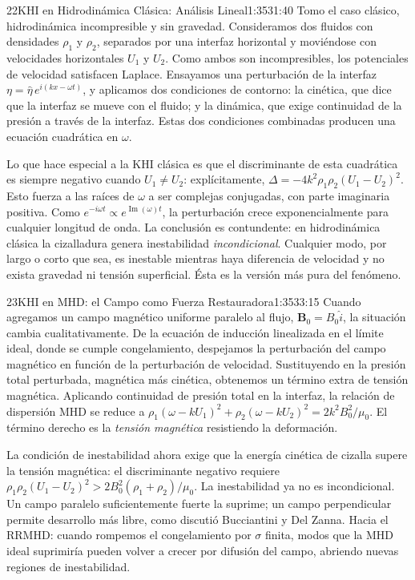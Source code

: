 \documentclass[11pt,a4paper]{article}
\begin{document}
\begin{seborador}{22}{KHI en Hidrodinámica Clásica: Análisis Lineal}{1:35}{31:40}
Tomo el caso clásico, hidrodinámica incompresible y sin gravedad.
Consideramos dos fluidos con densidades $\rho_1$ y $\rho_2$, separados por
una interfaz horizontal y moviéndose con velocidades horizontales $U_1$ y
$U_2$. Como ambos son incompresibles, los potenciales de velocidad satisfacen
Laplace. Ensayamos una perturbación de la interfaz
$\eta=\hat\eta\,e^{i(kx-\omega t)}$, y aplicamos dos condiciones de contorno:
la cinética, que dice que la interfaz se mueve con el fluido; y la dinámica,
que exige continuidad de la presión a través de la interfaz. Estas dos
condiciones combinadas producen una ecuación cuadrática en $\omega$.

Lo que hace especial a la KHI clásica es que el discriminante de esta
cuadrática es siempre negativo cuando $U_1\neq U_2$: explícitamente,
$\Delta=-4k^2\rho_1\rho_2(U_1-U_2)^2$. Esto fuerza a las raíces de $\omega$ a
ser complejas conjugadas, con parte imaginaria positiva. Como $e^{-i\omega t}
\propto e^{\operatorname{Im}(\omega)t}$, la perturbación crece
exponencialmente para cualquier longitud de onda. La conclusión es
contundente: en hidrodinámica clásica la cizalladura genera inestabilidad
\emph{incondicional}. Cualquier modo, por largo o corto que sea, es inestable
mientras haya diferencia de velocidad y no exista gravedad ni tensión
superficial. Ésta es la versión más pura del fenómeno.
\end{seborador}

\begin{seborador}{23}{KHI en MHD: el Campo como Fuerza Restauradora}{1:35}{33:15}
Cuando agregamos un campo magnético uniforme paralelo al flujo, $\mathbf{B}_0
=B_0\hat{i}$, la situación cambia cualitativamente. De la ecuación de
inducción linealizada en el límite ideal, donde se cumple congelamiento,
despejamos la perturbación del campo magnético en función de la perturbación
de velocidad. Sustituyendo en la presión total perturbada, magnética más
cinética, obtenemos un término extra de tensión magnética. Aplicando
continuidad de presión total en la interfaz, la relación de dispersión MHD se
reduce a $\rho_1(\omega-kU_1)^2+\rho_2(\omega-kU_2)^2=2k^2 B_0^2/\mu_0$. El
término derecho es la \emph{tensión magnética} resistiendo la deformación.

La condición de inestabilidad ahora exige que la energía cinética de cizalla
supere la tensión magnética: el discriminante negativo requiere
$\rho_1\rho_2(U_1-U_2)^2>2B_0^2(\rho_1+\rho_2)/\mu_0$. La inestabilidad ya no
es incondicional. Un campo paralelo suficientemente fuerte la suprime; un
campo perpendicular permite desarrollo más libre, como discutió Bucciantini
y Del Zanna. Hacia el RRMHD: cuando rompemos el congelamiento por $\sigma$
finita, modos que la MHD ideal suprimiría pueden volver a crecer por
difusión del campo, abriendo nuevas regiones de inestabilidad.
\end{seborador}
\end{document}
